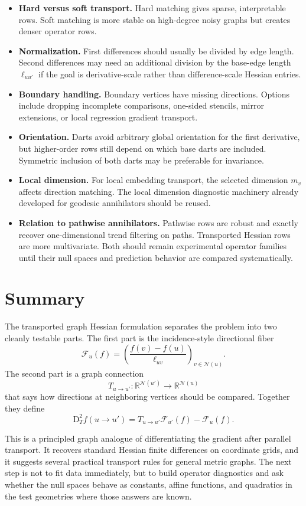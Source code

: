 \documentclass[11pt]{article}
\newcommand{\R}{\mathbb R}
\newcommand{\N}{\mathcal N}
\newcommand{\F}{\mathcal F}
\newcommand{\D}{\mathrm D}
\begin{document}
\begin{itemize}[leftmargin=*]
  \item \textbf{Hard versus soft transport.}  Hard matching gives sparse,
  interpretable rows.  Soft matching is more stable on high-degree noisy
  graphs but creates denser operator rows.

  \item \textbf{Normalization.}  First differences should usually be divided
  by edge length.  Second differences may need an additional division by the
  base-edge length \(\ell_{uu'}\) if the goal is derivative-scale rather than
  difference-scale Hessian entries.

  \item \textbf{Boundary handling.}  Boundary vertices have missing directions.
  Options include dropping incomplete comparisons, one-sided stencils, mirror
  extensions, or local regression gradient transport.

  \item \textbf{Orientation.}  Darts avoid arbitrary global orientation for the
  first derivative, but higher-order rows still depend on which base darts are
  included.  Symmetric inclusion of both darts may be preferable for invariance.

  \item \textbf{Local dimension.}  For local embedding transport, the selected
  dimension \(m_v\) affects direction matching.  The local dimension diagnostic
  machinery already developed for geodesic annihilators should be reused.

  \item \textbf{Relation to pathwise annihilators.}  Pathwise rows are robust
  and exactly recover one-dimensional trend filtering on paths.  Transported
  Hessian rows are more multivariate.  Both should remain experimental
  operator families until their null spaces and prediction behavior are
  compared systematically.
\end{itemize}

\section{Summary}

The transported graph Hessian formulation separates the problem into two
cleanly testable parts.  The first part is the incidence-style directional
fiber
\[
  \F_u(f)=\left(\frac{f(v)-f(u)}{\ell_{uv}}\right)_{v\in\N(u)}.
\]
The second part is a graph connection
\[
  T_{u\to u'}:\R^{\N(u')}\to\R^{\N(u)}
\]
that says how directions at neighboring vertices should be compared.  Together
they define
\[
  \D_T^2 f(u\to u')
  =
  T_{u\to u'}\F_{u'}(f)-\F_u(f).
\]

This is a principled graph analogue of differentiating the gradient after
parallel transport.  It recovers standard Hessian finite differences on
coordinate grids, and it suggests several practical transport rules for
general metric graphs.  The next step is not to fit data immediately, but to
build operator diagnostics and ask whether the null spaces behave as constants,
affine functions, and quadratics in the test geometries where those answers are
known.
\end{document}
